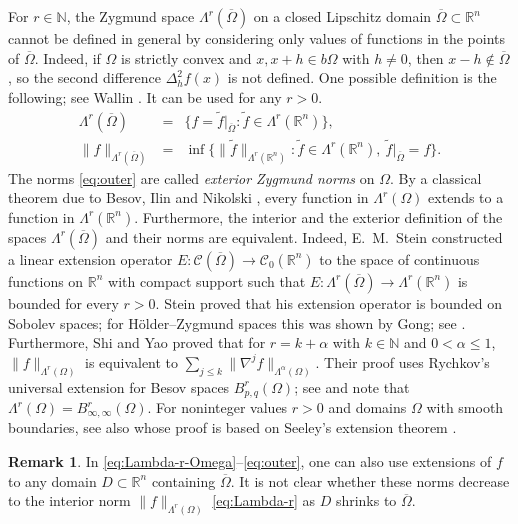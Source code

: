 \documentclass[11pt]{amsart}
\numberwithin{equation}{section}
\theoremstyle{definition}
\newtheorem{remark}[theorem]{Remark}
\newcommand\Cscr{\mathscr{C}}
\newcommand\N{\mathbb{N}}
\newcommand\R{\mathbb{R}}
\begin{document}
For $r\in \N$, the Zygmund space $\Lambda^r(\overline \Omega)$ 
on a closed Lipschitz domain $\overline\Omega\subset\R^n$ 
cannot be defined in general by considering only values of 
functions in the points of $\overline \Omega$. 
Indeed, if $\Omega$ is strictly convex 
and $x,x+h\in b\Omega$ with $h\ne 0$, then 
$x-h\notin \overline \Omega$, so the second difference $\Delta^2_h f(x)$ 
is not defined. One possible definition is the following; see 
Wallin \cite[Definition 8, p.\ 105]{Wallin1988}. It can be used 
for any $r>0$. 
\begin{eqnarray}\label{eq:Lambda-r-Omega}
	\Lambda^r(\overline \Omega) &=& 
	\big\{f=\tilde f|_{\overline \Omega}: \tilde f\in  \Lambda^r(\R^n)\big\}, \\
	\|f\|_{\Lambda^r(\overline\Omega)} &=& 
	\label{eq:outer}
	\inf\big\{ \|\tilde f\|_{\Lambda^r(\R^n)}: \tilde f \in \Lambda^r(\R^n),\
	 \tilde f|_{\overline \Omega} =f\big\}. 
\end{eqnarray}
The norms \eqref{eq:outer} are called {\em exterior Zygmund norms} 
on $\Omega$. By a classical theorem due to Besov, Ilin and Nikolski 
\cite[Theorem 18.5, p.\ 63]{BesovIlinNikolskii1979},
every function in $\Lambda^r(\Omega)$ extends to a function in 
$\Lambda^r(\R^n)$.
Furthermore, the interior and the exterior definition of the spaces 
$\Lambda^r(\overline\Omega)$ and their norms are equivalent. 
Indeed, E.\ M.\ Stein \cite[Sect.\ VI.2]{SteinEM1970}
constructed a linear extension operator 
$E:\Cscr(\overline\Omega) \to \Cscr_0(\R^n)$ 
to the space of continuous functions on $\R^n$ with compact support 
such that $E:\Lambda^r(\overline\Omega)\to \Lambda^r(\R^n)$ 
is bounded for every $r>0$. Stein proved that his extension operator 
is bounded on Sobolev spaces; for H\"older--Zygmund spaces 
this was shown by Gong; see \cite[Corollary 5.3]{Gong2025TAMS}.
Furthermore, Shi and Yao \cite[Theorem 1.1]{ShiYao2024} 
proved that for $r=k+\alpha$ with $k\in \N$ and $0<\alpha\le 1$,
$\|f\|_{\Lambda^r(\Omega)}$ is equivalent to
$\sum_{j\le k} \|\nabla^j f\|_{\Lambda^\alpha(\Omega)}$.
Their proof uses Rychkov's universal extension 
for Besov spaces $B^r_{p,q}(\Omega)$; see \cite{Rychkov1999}
and note that $\Lambda^r(\Omega)=B^r_{\infty,\infty}(\Omega)$. 
For noninteger values $r>0$ and domains $\Omega$ 
with smooth boundaries, see also 
\cite[Lemma 6.37]{GilbargTrudinger1983} whose 
proof is based on Seeley's extension theorem \cite{Seeley1964}. 	

\begin{remark}
In \eqref{eq:Lambda-r-Omega}--\eqref{eq:outer},
one can also use extensions of $f$ to any domain $D\subset \R^n$
containing $\overline\Omega$. It is not clear whether these norms 
decrease to the interior norm $\|f\|_{\Lambda^r(\Omega)}$ 
\eqref{eq:Lambda-r} as $D$ shrinks to $\overline\Omega$.
\end{remark}
	
\end{document}
